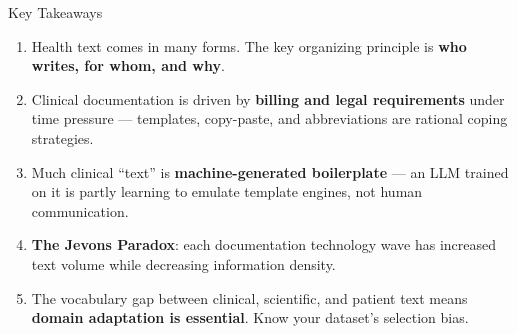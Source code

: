 \documentclass[aspectratio=169,11pt]{beamer}
\begin{document}
\begin{frame}{Key Takeaways}
\begin{enumerate}[<+->]\setlength\itemsep{0.02em}
  \item Health text comes in many forms. The key organizing principle is \textbf{who writes, for whom, and why}.
  \item Clinical documentation is driven by \textbf{billing and legal requirements} under time pressure --- templates, copy-paste, and abbreviations are rational coping strategies.
  \item Much clinical ``text'' is \textbf{machine-generated boilerplate} --- an LLM trained on it is partly learning to emulate template engines, not human communication.
  \item \textbf{The Jevons Paradox}: each documentation technology wave has increased text volume while decreasing information density.
  \item The vocabulary gap between clinical, scientific, and patient text means \textbf{domain adaptation is essential}. Know your dataset's selection bias.
\end{enumerate}

\end{frame}
\end{document}

